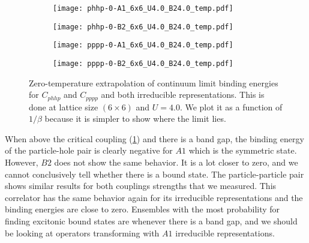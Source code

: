 \begin{figure}[!htbp]
    \begin{subfigure}{.5\textwidth}
      \centering
      \texttt{[image: phhp-0-A1\_6x6\_U4.0\_B24.0\_temp.pdf]}
    \end{subfigure}%
    \begin{subfigure}{.5\textwidth}
      \centering
      \texttt{[image: phhp-0-B2\_6x6\_U4.0\_B24.0\_temp.pdf]}
    \end{subfigure}
    \begin{subfigure}{.5\textwidth}
        \centering
        \texttt{[image: pppp-0-A1\_6x6\_U4.0\_B24.0\_temp.pdf]}
    \end{subfigure}
    \begin{subfigure}{.5\textwidth}
        \centering
        \texttt{[image: pppp-0-B2\_6x6\_U4.0\_B24.0\_temp.pdf]}
    \end{subfigure}
    \caption{Zero-temperature extrapolation of continuum limit binding energies for $C_{phhp}$ and $C_{pppp}$ and both irreducible representations. This is done at lattice size $(6\times 6)$ and $U=4.0$. We plot it as a function of $1/\beta$ because it is simpler to show where the limit lies.}
    \label{fig:u4temp}
  \end{figure}
When above the critical coupling (\cref{fig:u4temp}) and there is a band gap, the binding energy of the particle-hole pair is clearly negative for $A1$ which is the symmetric state. However, $B2$ does not show the same behavior. It is a lot closer to zero, and we cannot conclusively tell whether there is a bound state. The particle-particle pair shows similar results for both couplings strengths that we measured. This correlator has the same behavior again for its irreducible representations and the binding energies are close to zero. Ensembles with the most probability for finding excitonic bound states are whenever there is a band gap, and we should be looking at operators transforming with $A1$ irreducible representations.



